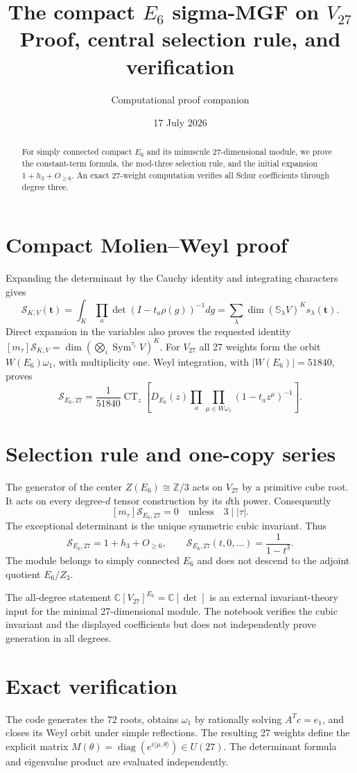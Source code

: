 \documentclass[10pt]{article}
\title{\color{navy}\textbf{The compact $E_6$ sigma-MGF on $V_{27}$}\\[1mm]\large Proof, central selection rule, and verification}
\author{Computational proof companion}\date{17 July 2026}
\newcommand{\Sg}{\mathcal S}\newcommand{\CT}{\operatorname{CT}}
\begin{document}
\maketitle
\begin{abstract}
For simply connected compact $E_6$ and its minuscule 27-dimensional module,
we prove the constant-term formula, the mod-three selection rule, and the
initial expansion $1+h_3+O_{\ge6}$.  An exact 27-weight computation verifies
all Schur coefficients through degree three.
\end{abstract}

\section{Compact Molien--Weyl proof}
Expanding the determinant by the Cauchy identity and integrating characters
gives
\[
 \boxed{\Sg_{K,V}(\mathbf t)=\int_K\prod_a\det(I-t_a\rho(g))^{-1}dg
 =\sum_\lambda\dim(\mathbb S_\lambda V)^K s_\lambda(\mathbf t).}
\]
Direct expansion in the variables also proves the requested identity
$[m_\tau]\Sg_{K,V}=\dim(\bigotimes_i\operatorname{Sym}^{\tau_i}V)^K$.
For $V_{27}$ all 27 weights form the orbit $W(E_6)\omega_1$, with multiplicity
one.  Weyl integration, with $|W(E_6)|=51840$, proves
\[
 \boxed{\Sg_{E_6,27}=\frac1{51840}\CT_z\left[D_{E_6}(z)
 \prod_a\prod_{\mu\in W\omega_1}(1-t_a z^\mu)^{-1}\right].}
\]

\section{Selection rule and one-copy series}
The generator of the center $Z(E_6)\cong\mathbb Z/3$ acts on $V_{27}$ by a
primitive cube root.  It acts on every degree-$d$ tensor construction by its
$d$th power.  Consequently
\[
 [m_\tau]\Sg_{E_6,27}=0\quad\text{unless}\quad 3\mid |\tau|.
\]
The exceptional determinant is the unique symmetric cubic invariant.  Thus
\[
 \boxed{\Sg_{E_6,27}=1+h_3+O_{\ge6}},\qquad
 \boxed{\Sg_{E_6,27}(t,0,\ldots)=\frac1{1-t^3}}.
\]
The module belongs to simply connected $E_6$ and does not descend to the
adjoint quotient $E_6/Z_3$.

The all-degree statement $\mathbb C[V_{27}]^{E_6}=\mathbb C[\det]$ is an
external invariant-theory input for the minimal 27-dimensional module.  The
notebook verifies the cubic invariant and the displayed coefficients but does
not independently prove generation in all degrees.

\section{Exact verification}
The code generates the 72 roots, obtains $\omega_1$ by rationally solving
$A^Tc=e_1$, and closes its Weyl orbit under simple reflections.  The resulting
27 weights define the explicit matrix
$M(\theta)=\operatorname{diag}(e^{i\langle\mu,\theta\rangle})\in U(27)$.
The determinant formula and eigenvalue product are evaluated independently.
\end{document}
